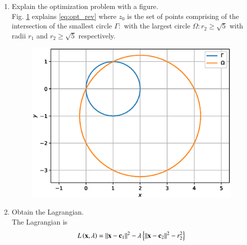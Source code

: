 \documentclass[journal,12pt,twocolumn]{IEEEtran}
\renewcommand\thesection{\arabic{section}}
\begin{document}
\begin{enumerate}[label=\thesection.\arabic*
,ref=\thesection.\theenumi]
%
%
%
%
%
\item Explain the optimization problem with a figure.
\\
\solution
Fig. \ref{fig:2019_1} explains \eqref{eq:opt_rev}
where $z_0$ is the set of points comprising of the intersection of the 
smallest circle $\Gamma:$ with the largest circle $\Omega: r_2 \ge 
\sqrt{5}$ 
with radii 
$r_1$ and 
$r_2 \ge \sqrt{5}$ respectively.
\begin{figure}[!ht]
\centering
\includegraphics[width=\columnwidth]{./figs/2019_1_1.eps}
\caption{}
\label{fig:2019_1}
\end{figure}
%
\item Obtain the Lagrangian.
\\
\solution
The Lagrangian is 
\begin{align}
L \left(\mathbf{x},\lambda\right) = \left\Vert\mathbf{x} - \mathbf{c}_1\right\Vert^2 - \lambda 
\left\{\left\Vert\mathbf{x} - \mathbf{c}_2\right\Vert^2-r_2^2\right\}
\end{align}

\end{enumerate}
\end{document}
